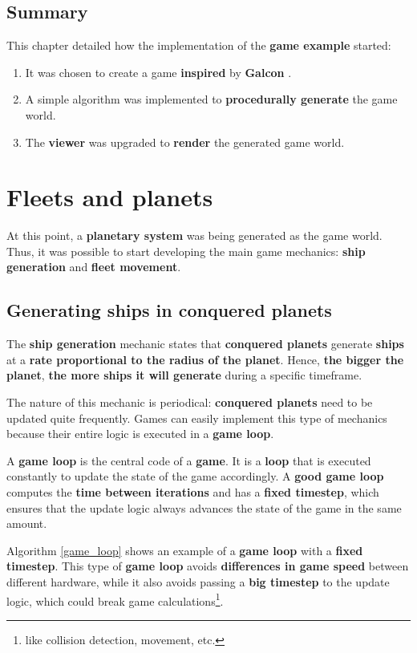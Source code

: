 \documentclass[a4paper,11pt,titlepage,abstract,numbers=noenddot,automark,mnsy,intlimits,rgb,dvipsnames]{report}
\begin{document}
\section{Summary}
This chapter detailed how the implementation of the \textbf{game example} started:
\begin{enumerate}
\item
It was chosen to create a game \textbf{inspired} by \textbf{Galcon} \cite{galcon}.
\item
A simple algorithm was implemented to \textbf{procedurally generate} the game world.
\item
The \textbf{viewer} was upgraded to \textbf{render} the generated game world.
\end{enumerate}
\chapter{Fleets and planets}
At this point, a \textbf{planetary system} was being generated as the game world. Thus, it was possible to start developing 
the main game mechanics: \textbf{ship generation} and \textbf{fleet movement}.
\section{Generating ships in conquered planets}
The \textbf{ship generation} mechanic states that \textbf{conquered planets} generate \textbf{ships} at a \textbf{rate proportional to the
radius of the planet}. Hence, \textbf{the bigger the planet}, \textbf{the more ships it will generate} during a specific timeframe.

The nature of this mechanic is periodical: \textbf{conquered planets} need to be updated quite frequently. Games can easily
implement this type of mechanics because their entire logic is executed in a \textbf{game loop}.

A \textbf{game loop} is the central code of a \textbf{game}. It is a \textbf{loop} that is executed constantly to update the state of
the game accordingly. A \textbf{good game loop} computes the \textbf{time between iterations} and has a \textbf{fixed timestep}, which ensures
that the update logic always advances the state of the game in the same amount.

Algorithm \autoref{game_loop} shows an example of a \textbf{game loop} with a \textbf{fixed timestep}. This type of \textbf{game loop}
avoids \textbf{differences in game speed} between different hardware, while it also avoids passing a \textbf{big timestep} to the
update logic, which could break game calculations\footnote{like collision detection, movement, etc.}.
\end{document}
